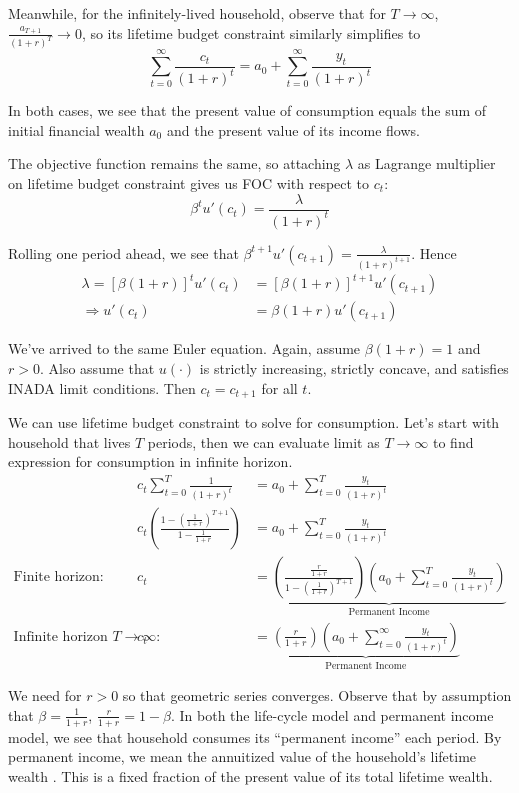 \documentclass[11pt]{article}
\begin{document}
Meanwhile, for the infinitely-lived household, observe that for $T \to \infty$, $\frac{a_{T+1}}{(1+r)^T} \to 0$, so its lifetime budget constraint similarly simplifies to $$\sum_{t=0}^\infty \frac{c_t}{(1+r)^t} = a_0 + \sum_{t=0}^\infty \frac{y_t}{(1+r)^t}$$

In both cases, we see that the present value of consumption equals the sum of initial financial wealth $a_0$ and the present value of its income flows.

The objective function remains the same, so attaching $\lambda$ as Lagrange multiplier on lifetime budget constraint gives us FOC with respect to $c_t$: $$\beta^t u'(c_t) = \frac{\lambda}{(1+r)^t}$$

Rolling one period ahead, we see that $\beta^{t+1} u'(c_{t+1}) = \frac{\lambda}{(1+r)^{t+1}}$. Hence 
\begin{align*}
    \lambda = [\beta(1+r)]^t u'(c_t) &= [\beta (1+r)]^{t+1} u'(c_{t+1}) \\
    \Rightarrow u'(c_t) &= \beta(1+r)u'(c_{t+1})
\end{align*}

We've arrived to the same Euler equation. Again, assume $\beta(1+r) = 1$ and $r > 0$. Also assume that $u(\cdot)$ is strictly increasing, strictly concave, and satisfies INADA limit conditions. Then $c_t = c_{t+1}$ for all $t$.

We can use lifetime budget constraint to solve for consumption. Let's start with household that lives $T$ periods, then we can evaluate limit as $T \to \infty$ to find expression for consumption in infinite horizon.
\begin{align}
    && c_t \sum_{t=0}^T \frac{1}{(1+r)^t} &= a_0 + \sum_{t=0}^T \frac{y_t}{(1+r)^t} \nonumber \\
    && c_t \left(\frac{1 - \left(\frac{1}{1+r}\right)^{T+1}}{1-\frac{1}{1+r}}\right) &= a_0 + \sum_{t=0}^T \frac{y_t}{(1+r)^t} \nonumber \\
    \text{Finite horizon:} && c_t &= \underbrace{\left(\frac{\frac{r}{1+r}}{1 - \left(\frac{1}{1+r}\right)^{T+1}}\right) \left(a_0 + \sum_{t=0}^T \frac{y_t}{(1+r)^t}\right)}_{\text{Permanent Income}} \label{eqn:ctdeterministicfinite} \\
    \text{Infinite horizon $T \to \infty$:} && c_t &= \underbrace{\left(\frac{r}{1+r}\right)\left(a_0 + \sum_{t=0}^\infty \frac{y_t}{(1+r)^t}\right)}_{\text{Permanent Income}} \label{eqn:ctdeterministic}
\end{align}

We need for $r > 0$ so that geometric series converges. Observe that by assumption that $\beta = \frac{1}{1+r}$, $\frac{r}{1+r} = 1-\beta$. In both the life-cycle model and permanent income model, we see that household consumes its ``permanent income'' each period. By permanent income, we mean the annuitized value of the household's lifetime wealth \textcite{seater}. This is a fixed fraction of the present value of its total lifetime wealth.
\end{document}
